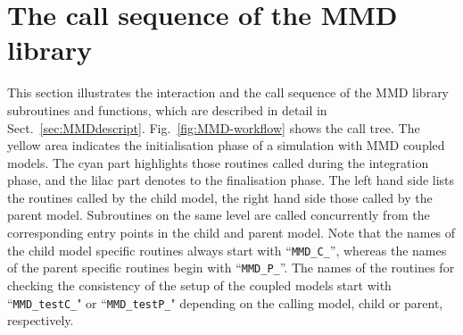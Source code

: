 \documentclass[twoside]{article}
\begin{document}
\section{The call sequence of the MMD library\label{sec:workflow}}

This section illustrates the interaction and the call sequence of the 
MMD library subroutines and functions, which are described in detail in Sect.\
\ref{sec:MMDdescript}. 
Fig.\ \ref{fig:MMD-workflow} shows the call tree.
 The yellow area indicates the initialisation
 phase of a simulation with MMD coupled 
models. The cyan part highlights those routines called during the 
 integration phase, and the lilac part denotes to the finalisation phase. 
The left hand side lists the routines called by the child model, the
 right hand side those called by the parent model.
Subroutines on the same level are called concurrently from the corresponding 
entry points in the child and parent model. Note that the names of the
 child model 
 specific 
 routines always start with ``\verb|MMD_C_|'', whereas the names of the parent 
specific routines begin with ``\verb|MMD_P_|''.  The names of the routines for 
 checking the consistency of the setup of the coupled models start with 
``\verb|MMD_testC_|" or ``\verb|MMD_testP_|" depending on the calling model, 
child or parent, respectively.
\end{document}
